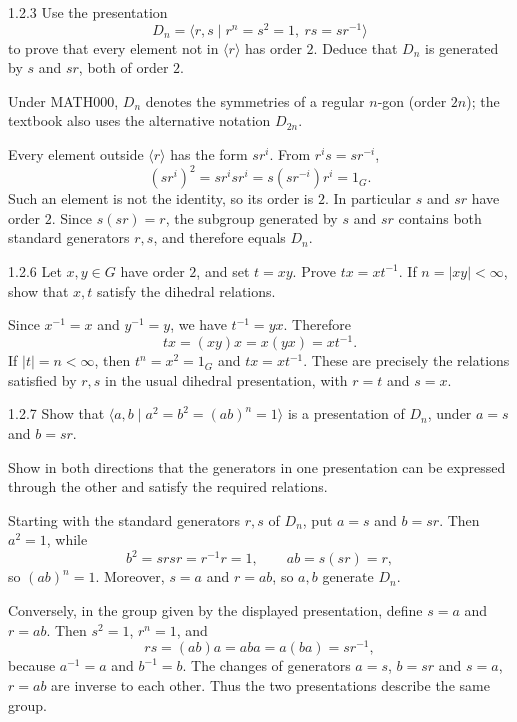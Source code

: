 \documentclass[11pt,oneside]{article}
\begin{document}
\begin{exercise}{1.2.3}
Use the presentation
\[
D_n=\langle r,s\mid r^n=s^2=1,\ rs=sr^{-1}\rangle
\]
to prove that every element not in $\langle r\rangle$ has order $2$. Deduce that $D_n$ is generated by $s$ and $sr$, both of order $2$.
\end{exercise}

\begin{notation}
Under MATH000, $D_n$ denotes the symmetries of a regular $n$-gon (order $2n$); the textbook also uses the alternative notation $D_{2n}$.
\end{notation}

\begin{solution}
Every element outside $\langle r\rangle$ has the form $sr^i$. From $r^is=sr^{-i}$,
\[
 (sr^i)^2=sr^isr^i=s(sr^{-i})r^i=1_G.
\]
Such an element is not the identity, so its order is $2$. In particular $s$ and $sr$ have order $2$. Since $s(sr)=r$, the subgroup generated by $s$ and $sr$ contains both standard generators $r,s$, and therefore equals $D_n$.
\end{solution}

\begin{exercise}{1.2.6}
Let $x,y\in G$ have order $2$, and set $t=xy$. Prove $tx=xt^{-1}$. If $n=|xy|<\infty$, show that $x,t$ satisfy the dihedral relations.
\end{exercise}

\begin{solution}
Since $x^{-1}=x$ and $y^{-1}=y$, we have $t^{-1}=yx$. Therefore
\[
 tx=(xy)x=x(yx)=xt^{-1}.
\]
If $|t|=n<\infty$, then $t^n=x^2=1_G$ and $tx=xt^{-1}$. These are precisely the relations satisfied by $r,s$ in the usual dihedral presentation, with $r=t$ and $s=x$.
\end{solution}

\begin{exercise}{1.2.7}
Show that $\langle a,b\mid a^2=b^2=(ab)^n=1\rangle$ is a presentation of $D_n$, under $a=s$ and $b=sr$.
\end{exercise}

\begin{hint}
Show in both directions that the generators in one presentation can be expressed through the other and satisfy the required relations.
\end{hint}

\begin{solution}
Starting with the standard generators $r,s$ of $D_n$, put $a=s$ and $b=sr$. Then $a^2=1$, while
\[
 b^2=srsr=r^{-1}r=1,
 \qquad ab=s(sr)=r,
\]
so $(ab)^n=1$. Moreover, $s=a$ and $r=ab$, so $a,b$ generate $D_n$.

Conversely, in the group given by the displayed presentation, define $s=a$ and $r=ab$. Then $s^2=1$, $r^n=1$, and
\[
 rs=(ab)a=aba=a(ba)=sr^{-1},
\]
because $a^{-1}=a$ and $b^{-1}=b$. The changes of generators $a=s$, $b=sr$ and $s=a$, $r=ab$ are inverse to each other. Thus the two presentations describe the same group.
\end{solution}
\end{document}
